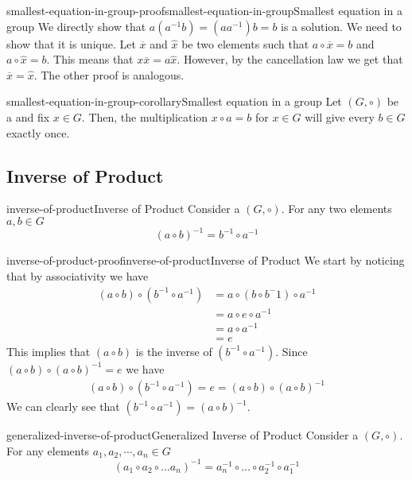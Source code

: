 \documentclass[preview]{standalone}
\begin{document}
\begin{snippetproof}{smallest-equation-in-group-proof}{smallest-equation-in-group}{Smallest equation in a group}
    We directly show that \(a(a^{-1} b) = (aa^{-1})b = b\)
    is a solution. We need to show that it is unique.
    Let \(\overline{x}\) and \(\hat{x}\) be two elements such that
    \(a \circ \overline{x} = b\) and \(a \circ \hat{x} = b\).
    This means that \(x\overline{x} = a\hat{x}\). However, by the cancellation law
    we get that \(\overline{x} = \hat{x}\).
    The other proof is analogous.
\end{snippetproof}

\begin{snippetcorollary}{smallest-equation-in-group-corollary}{Smallest equation in a group}
    Let \((G, \circ)\) be a \group and fix \(x\in G\).
    Then, the multiplication \(x \circ a = b\) for \(x\in G\) will give every \(b \in G\)
    exactly once.
\end{snippetcorollary}

\subsection{Inverse of Product}

\begin{snippettheorem}{inverse-of-product}{Inverse of Product}
    Consider a \group \((G, \circ)\). For any two elements \(a,b \in G\)
    \[{(a \circ b)}^{-1} = b^{-1} \circ a^{-1}\]
\end{snippettheorem}

\begin{snippetproof}{inverse-of-product-proof}{inverse-of-product}{Inverse of Product}
    We start by noticing that by associativity we have
    \begin{align*}
        (a \circ b) \circ (b^{-1} \circ a^{-1}) &= a \circ (b \circ b^-1) \circ a^{-1} \\
        &= a \circ e \circ a^{-1} \\
        &= a \circ a^{-1} \\
        &= e
    \end{align*}
    This implies that \((a \circ b)\) is the inverse of \((b^{-1} \circ a^{-1})\).
    Since \((a\circ b) \circ {(a \circ b)}^{-1} =e\) we have
    \begin{align*}
        (a \circ b) \circ (b^{-1} \circ a^{-1}) = e = (a\circ b) \circ {(a \circ b)}^{-1}
    \end{align*}
    We can clearly see that \((b^{-1} \circ a^{-1}) = {(a \circ b)}^{-1}\).
\end{snippetproof}

\begin{snippettheorem}{generalized-inverse-of-product}{Generalized Inverse of Product}
    Consider a \group \((G, \circ)\). For any elements \(a_1,a_2,\cdots,a_n \in G\)
    \[
        (a_1 \circ a_2 \circ \dots a_n)^{-1}
        = a_n^{-1} \circ \dots \circ a_2^{-1} \circ a_1^{-1}
    \]
\end{snippettheorem}
\end{document}
